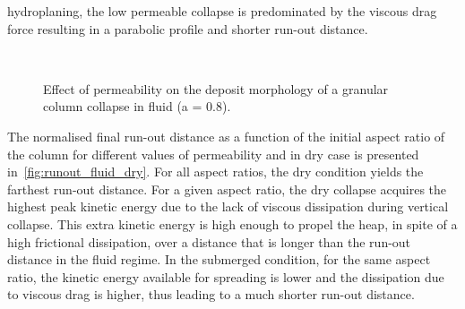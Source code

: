 hydroplaning, the low 
permeable collapse is predominated by the viscous drag force resulting in a 
parabolic profile and shorter run-out distance. 
\begin{figure}
\\
\caption{Effect of permeability on the deposit morphology of a granular column 
collapse in fluid (a = 0.8).}
\label{fig:a08_dense_snapshots}
\end{figure}

The normalised final run-out distance as a function of the initial aspect ratio 
of the column for different values of permeability and in dry case is presented 
in~\cref{fig:runout_fluid_dry}. For all aspect ratios, the dry condition yields 
the farthest run-out distance. For a given aspect ratio, the dry collapse 
acquires the highest peak kinetic energy due to the lack of viscous dissipation 
during vertical collapse. This extra kinetic energy is high enough to propel 
the heap, in spite of a high frictional dissipation, over a distance that is 
longer than the run-out distance in the fluid regime. In the submerged 
condition, for the same aspect ratio, the kinetic energy available for 
spreading is lower and the dissipation due to viscous drag is higher, thus 
leading to a much shorter run-out distance. 

